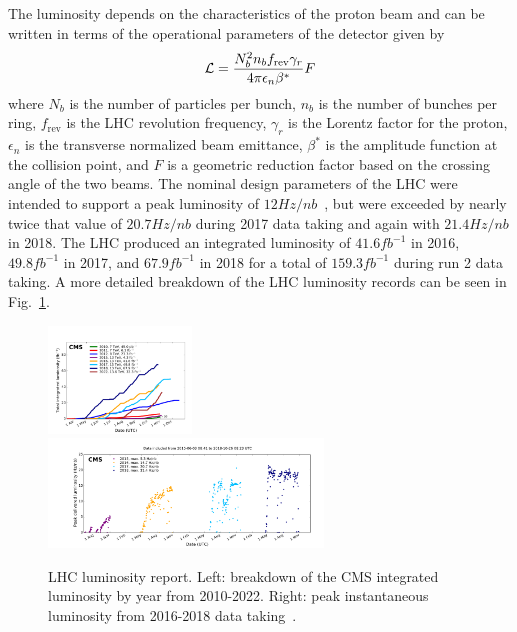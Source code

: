The luminosity depends on the characteristics of the proton beam and can be written in terms of the operational parameters of the detector given by
\begin{equation}
	\mathcal{L}=\frac{N_b^2n_bf_\mathrm{rev}\gamma_r}{4\pi\epsilon_n\beta^*}F
\end{equation}
where $N_b$ is the number of particles per bunch, $n_b$ is the number of bunches per ring, $f_\mathrm{rev}$ is the LHC revolution frequency, $\gamma_r$ is the Lorentz factor for the proton, $\epsilon_n$ is the transverse normalized beam emittance, $\beta^*$ is the amplitude function at the collision point, and $F$ is a geometric reduction factor based on the crossing angle of the two beams. The nominal design parameters of the LHC were intended to support a peak luminosity of $12\unit{Hz/nb}$~\cite{Bruning:782076}, but were exceeded by nearly twice that value of $20.7\unit{Hz/nb}$ during 2017 data taking and again with $21.4\unit{Hz/nb}$ in 2018. The LHC produced an integrated luminosity of $41.6\unit{fb^{-1}}$ in 2016, $49.8\unit{fb^{-1}}$ in 2017, and $67.9\unit{fb^{-1}}$ in 2018 for a total of $159.3\unit{fb^{-1}}$ during run 2 data taking. A more detailed breakdown of the LHC luminosity records can be seen in Fig.~\ref{fig:LHC_lumi}.

\begin{figure}[!htbp]
	\centering
	\includegraphics[width=0.34\textwidth]{figs/03_experiment/int_lumi_cumulative_pp_2.pdf}
	\includegraphics[width=0.65\textwidth]{figs/03_experiment/peak_lumi_pp_run2.pdf}
	\caption[LHC luminosity report. Left: breakdown of the CMS integrated luminosity by year from 2010-2022. Right:  peak luminosity from 2016-2018 data taking~\cite{CMSlumi}.]
	{LHC luminosity report. Left: breakdown of the CMS integrated luminosity by year from 2010-2022. Right: peak instantaneous luminosity from 2016-2018 data taking~\cite{CMSlumi}.}
	\label{fig:LHC_lumi}
\end{figure}

